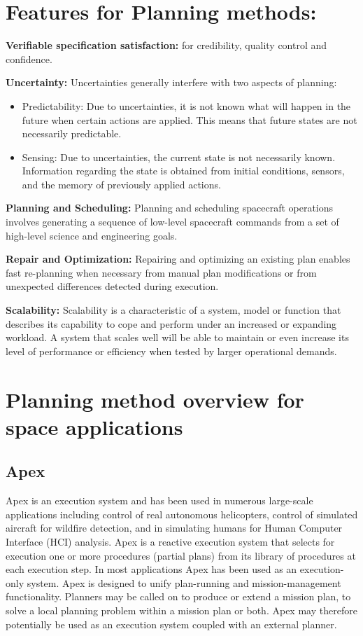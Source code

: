 \documentclass[conference]{IEEEtran}
\begin{document}
\section{Features for Planning methods: }
\textbf{Verifiable specification satisfaction: }
for credibility, quality control and confidence.

\textbf{Uncertainty: }
Uncertainties generally interfere with two aspects of planning:
\begin{itemize}
\item Predictability: Due to uncertainties, it is not known what will happen in the future when certain actions are applied. This means that future states are not necessarily predictable.
\item Sensing: Due to uncertainties, the current state is not necessarily known. Information regarding the state is obtained from initial conditions, sensors, and the memory of previously applied actions.
\end{itemize}

\textbf{Planning and Scheduling: }
Planning and scheduling spacecraft operations involves generating a sequence of low-level spacecraft commands from a set of high-level science and engineering goals.

\textbf{Repair and Optimization: }
Repairing and optimizing an existing plan enables fast re-planning when necessary from manual plan modifications or from unexpected differences detected during execution.

\textbf{Scalability: }
Scalability is a characteristic of a system, model or function that describes its capability to cope and perform under an increased or expanding workload. A system that scales well will be able to maintain or even increase its level of performance or efficiency when tested by larger operational demands.

\section{Planning method overview for space applications}

\subsection{\textbf{Apex}}\label{sec:apex}
Apex is an execution system and has been used in numerous large-scale applications including control of real autonomous helicopters, control of simulated aircraft for wildfire detection, and in simulating humans for Human Computer Interface (HCI) analysis.
Apex is a reactive execution system that selects for execution one or more procedures (partial plans) from its library of procedures at each execution step. In most applications Apex has been used as an execution-only system. Apex is designed to unify plan-running and mission-management functionality. Planners may be called on to produce or extend a mission plan, to solve a local planning problem within a mission plan or both. Apex may therefore potentially be used as an execution system coupled with an external planner.
\end{document}
